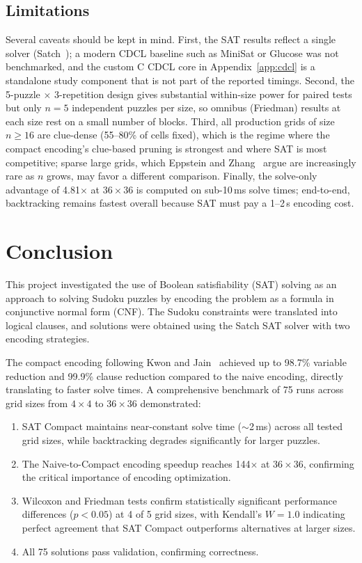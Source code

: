 \documentclass[12pt]{article}
\begin{document}
\subsection{Limitations}
Several caveats should be kept in mind. First, the SAT results reflect a single solver (Satch~\citep{Satch}); a modern CDCL baseline such as MiniSat or Glucose was not benchmarked, and the custom C CDCL core in Appendix~\ref{app:cdcl} is a standalone study component that is not part of the reported timings. Second, the 5-puzzle $\times$ 3-repetition design gives substantial within-size power for paired tests but only $n=5$ independent puzzles per size, so omnibus (Friedman) results at each size rest on a small number of blocks. Third, all production grids of size $n \geq 16$ are clue-dense (55--80\% of cells fixed), which is the regime where the compact encoding's clue-based pruning is strongest and where SAT is most competitive; sparse large grids, which Eppstein and Zhang~\citep{EppsteinZhang2026} argue are increasingly rare as $n$ grows, may favor a different comparison. Finally, the solve-only advantage of 4.81$\times$ at $36\times36$ is computed on sub-10\,ms solve times; end-to-end, backtracking remains fastest overall because SAT must pay a 1--2\,s encoding cost.


\section{Conclusion}

This project investigated the use of Boolean satisfiability (SAT) solving as an approach to solving Sudoku puzzles by encoding the problem as a formula in conjunctive normal form (CNF). The Sudoku constraints were translated into logical clauses, and solutions were obtained using the Satch SAT solver with two encoding strategies.

The compact encoding following Kwon and Jain~\citep{KwonJain2006} achieved up to 98.7\% variable reduction and 99.9\% clause reduction compared to the naive encoding, directly translating to faster solve times. A comprehensive benchmark of 75 runs across grid sizes from $4\times4$ to $36\times36$ demonstrated:

\begin{enumerate}
    \item SAT Compact maintains near-constant solve time ($\sim$2\,ms) across all tested grid sizes, while backtracking degrades significantly for larger puzzles.
    \item The Naive-to-Compact encoding speedup reaches 144$\times$ at $36\times36$, confirming the critical importance of encoding optimization.
    \item Wilcoxon and Friedman tests confirm statistically significant performance differences ($p < 0.05$) at 4 of 5 grid sizes, with Kendall's $W = 1.0$ indicating perfect agreement that SAT Compact outperforms alternatives at larger sizes.
    \item All 75 solutions pass validation, confirming correctness.
\end{enumerate}
\end{document}
